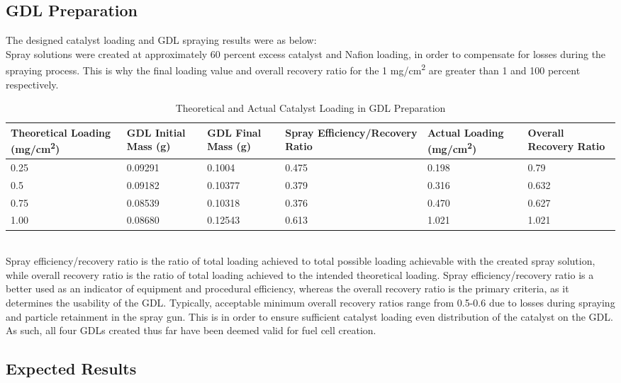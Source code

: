 \documentclass{article}
\begin{document}
	\subsection{GDL Preparation}
	The designed catalyst loading and GDL spraying results were as below:\\
Spray solutions were created at approximately 60 percent excess catalyst and Nafion loading, in order to compensate for losses during the spraying process. This is why the final loading value and overall recovery ratio for the 1 mg/cm\textsuperscript{2} are greater than 1 and 100 percent respectively.
\begin{table}[ht]
\caption{Theoretical and Actual Catalyst Loading in GDL Preparation}
\centering
\noindent\begin{tabularx}{\linewidth}{|X|X|X|X|X|X}
\hline
Theoretical Loading (mg/cm\textsuperscript{2}) & GDL Initial Mass (g) & GDL Final Mass (g) & Spray Efficiency/Recovery Ratio & Actual Loading (mg/cm\textsuperscript{2}) & Overall Recovery Ratio \\
\hline
0.25 & 0.09291 & 0.1004 & 0.475 & 0.198 & 0.79\\
\hline
0.5 & 0.09182 & 0.10377 & 0.379 & 0.316 & 0.632\\
\hline
0.75 & 0.08539 & 0.10318 & 0.376 & 0.470 & 0.627\\
\hline
1.00 & 0.08680 & 0.12543 & 0.613 & 1.021 & 1.021\\
\hline
\end{tabularx}
\label{table:gdlload}
\end{table}\\
Spray efficiency/recovery ratio is the ratio of total loading achieved to total possible loading achievable with the created spray solution, while overall recovery ratio is the ratio of total loading achieved to the intended theoretical loading. Spray efficiency/recovery ratio is a better used as an indicator of equipment and procedural efficiency, whereas the overall recovery ratio is the primary criteria, as it determines the usability of the GDL. Typically, acceptable minimum overall recovery ratios range from 0.5-0.6 due to losses during spraying and particle retainment in the spray gun. This is in order to ensure sufficient catalyst loading even distribution of the catalyst on the GDL. As such, all four GDLs created thus far have been deemed valid for fuel cell creation.
  	\subsection{Expected Results}
\end{document}

